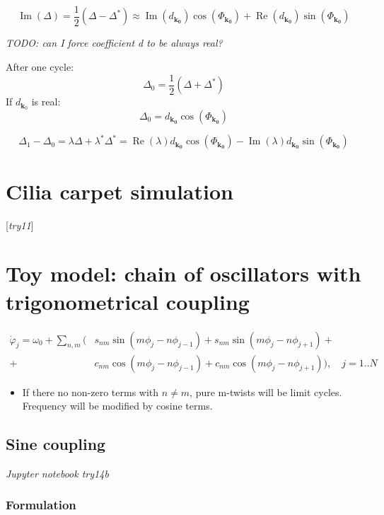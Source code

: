 \documentclass[a4paper,12pt]{article}
\renewcommand{\Re}{\operatorname{Re}}
\renewcommand{\Im}{\operatorname{Im}}
\newcommand{\D}{\Delta}%
\begin{document}
$$
\Im(\D)
= \frac{1}{2} ( \D - \D^*)
\approx  \Im(d_{\mathbf{k_0}}) \cos(\Phi_{\mathbf{k_0}}) + \Re(d_{\mathbf{k_0}}) \sin(\Phi_{\mathbf{k_0}})
$$

\emph{TODO: can I force coefficient d to be always real?
}

After one cycle:
$$
\D_0 = \frac{1}{2} (\D + \D^*) 
$$
If $d_{\mathbf{k}_0}$ is real:
$$
\D_0 =  d_{\mathbf{k_0}} \cos(\Phi_{\mathbf{k_0}})
$$

$$
\D_1 - \D_0 = \lambda \D + \lambda^* \D^* = \Re(\lambda)d_{\mathbf{k_0}} \cos(\Phi_{\mathbf{k_0}}) - \Im(\lambda)  d_{\mathbf{k_0}} \sin(\Phi_{\mathbf{k_0}})
$$


\section{Cilia carpet simulation}
[\textit{try11}]




\section{Toy model: chain of oscillators with trigonometrical coupling}
\newcommand{\fr}[2]{\frac{2 \pi #1} {N} #2 } %
\newcommand{\si}[2]{\sin  \fr{#1}{#2} } %
\newcommand{\co}[2]{\cos \fr{#1}{#2} } 
\newcommand{\ex}[2]{e ^{i \fr{#1}{#2}}}



\begin{align*}
\dot \varphi_j = \omega_0 + \sum_{n,m} ( & s_{nm}\sin(m\phi_j - n \phi_{j-1}) + s_{nm}\sin(m\phi_j - n \phi_{j+1}) +\\
+ & c_{nm} \cos(m\phi_j - n \phi_{j-1}) + c_{nm} \cos(m\phi_j - n \phi_{j+1}) ), \quad j=1..N
\end{align*}

\begin{itemize}
\item If there no non-zero terms with $n \neq m$, pure m-twists will be limit cycles. Frequency will be modified by cosine terms.
\end{itemize}



\subsection{Sine coupling }
\textit{Jupyter notebook try14b
}
\subsubsection{Formulation}
\end{document}

